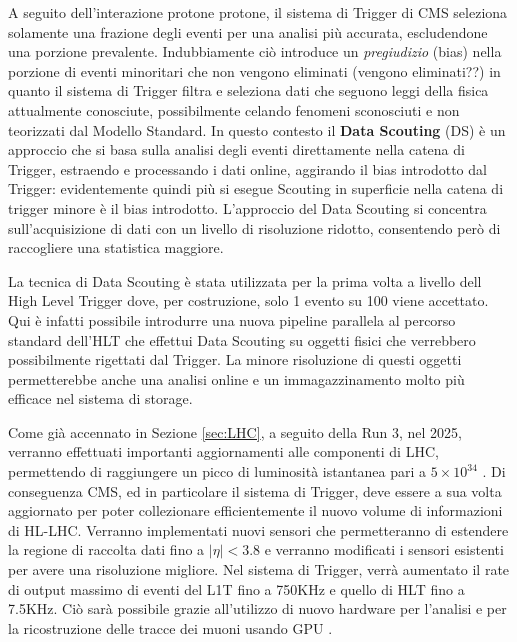 A seguito dell'interazione protone protone, il sistema di Trigger di CMS seleziona solamente una frazione degli eventi per una analisi più accurata, escludendone una porzione prevalente. Indubbiamente ciò introduce un \textit{pregiudizio} (bias) nella porzione di eventi minoritari che non vengono eliminati (vengono eliminati??) in quanto il sistema di Trigger filtra e seleziona dati che seguono leggi della fisica attualmente conosciute, possibilmente celando fenomeni sconosciuti e non teorizzati dal Modello Standard. \newline
In questo contesto il \textbf{ Data Scouting} (DS) è un approccio che si basa sulla analisi degli eventi direttamente nella catena di Trigger, estraendo e processando i dati online, aggirando il bias introdotto dal Trigger: evidentemente quindi più si esegue Scouting in superficie nella catena di trigger minore è il bias introdotto. L'approccio del Data Scouting si concentra sull'acquisizione di dati con un livello di risoluzione ridotto, consentendo però di raccogliere una statistica maggiore.

La tecnica di Data Scouting è stata utilizzata per la prima volta a livello dell High Level Trigger dove, per costruzione, solo 1 evento su 100 viene accettato. Qui è infatti possibile introdurre una nuova pipeline parallela al percorso standard dell'HLT che effettui Data Scouting su oggetti fisici che verrebbero possibilmente rigettati dal Trigger. La minore risoluzione di questi oggetti permetterebbe anche una analisi online e un immagazzinamento molto più efficace nel sistema di storage. 

Come già accennato in Sezione \ref{sec:LHC}, a seguito della Run 3, nel 2025, verranno effettuati importanti aggiornamenti alle componenti di LHC, permettendo di raggiungere un picco di luminosità istantanea pari a $5 \times 10^{34}$ \Lumi. Di conseguenza CMS, ed in particolare il sistema di Trigger, deve essere a sua volta aggiornato per poter collezionare efficientemente il nuovo volume di informazioni di HL-LHC. Verranno implementati nuovi sensori che permetteranno di estendere la regione di raccolta dati fino a $|\eta| < 3.8$ e verranno modificati i sensori esistenti per avere una risoluzione migliore. Nel sistema di Trigger, verrà aumentato il rate di output massimo di eventi del L1T fino a 750KHz e quello di HLT fino a 7.5KHz. Ciò sarà possibile grazie all'utilizzo di nuovo hardware per l'analisi e per la ricostruzione delle tracce dei muoni usando GPU \cite{collaboration2021phase}.



